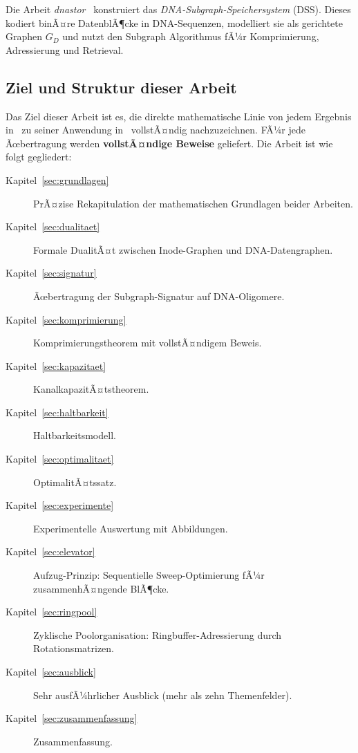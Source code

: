 ﻿\documentclass[a4paper,12pt]{article}
\theoremstyle{definition}
\theoremstyle{plain}
\begin{document}
Die Arbeit \textit{dnastor}~\cite{dnastor} konstruiert das
\emph{DNA-Subgraph-Speichersystem} (DSS).  Dieses kodiert binÃ¤re
DatenblÃ¶cke in DNA-Sequenzen, modelliert sie als gerichtete Graphen
$G_D$ und nutzt den Subgraph Algorithmus fÃ¼r Komprimierung,
Adressierung und Retrieval.

\subsection{Ziel und Struktur dieser Arbeit}

Das Ziel dieser Arbeit ist es, die direkte mathematische Linie von jedem
Ergebnis in~\cite{dusgraph} zu seiner Anwendung in~\cite{dnastor}
vollstÃ¤ndig nachzuzeichnen.  FÃ¼r jede Ãœbertragung werden
\textbf{vollstÃ¤ndige Beweise} geliefert.  Die Arbeit ist wie folgt
gegliedert:

\begin{description}
  \item[Kapitel~\ref{sec:grundlagen}] PrÃ¤zise Rekapitulation der
        mathematischen Grundlagen beider Arbeiten.
  \item[Kapitel~\ref{sec:dualitaet}] Formale DualitÃ¤t zwischen
        Inode-Graphen und DNA-Datengraphen.
  \item[Kapitel~\ref{sec:signatur}] Ãœbertragung der Subgraph-Signatur
        auf DNA-Oligomere.
  \item[Kapitel~\ref{sec:komprimierung}] Komprimierungstheorem mit
        vollstÃ¤ndigem Beweis.
  \item[Kapitel~\ref{sec:kapazitaet}] KanalkapazitÃ¤tstheorem.
  \item[Kapitel~\ref{sec:haltbarkeit}] Haltbarkeitsmodell.
  \item[Kapitel~\ref{sec:optimalitaet}] OptimalitÃ¤tssatz.
  \item[Kapitel~\ref{sec:experimente}] Experimentelle Auswertung mit
        Abbildungen.
  \item[Kapitel~\ref{sec:elevator}] Aufzug-Prinzip: Sequentielle
        Sweep-Optimierung fÃ¼r zusammenhÃ¤ngende BlÃ¶cke.
  \item[Kapitel~\ref{sec:ringpool}] Zyklische Poolorganisation:
        Ringbuffer-Adressierung durch Rotationsmatrizen.
  \item[Kapitel~\ref{sec:ausblick}] Sehr ausfÃ¼hrlicher Ausblick
        (mehr als zehn Themenfelder).
  \item[Kapitel~\ref{sec:zusammenfassung}] Zusammenfassung.
\end{description}
\end{document}
